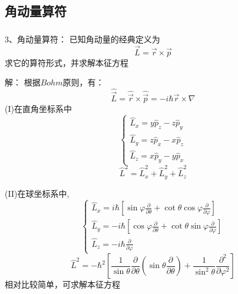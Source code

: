 \subsection{角动量算符}

\begin{frame} [allowframebreaks=]
    \frametitle{}
    \begin{tcolorbox1}{3、角动量算符：}
        已知角动量的经典定义为
    $$\vec{L}=\vec{r}\times\vec{p}$$ 
    求它的算符形式，并求解本征方程     
    \end{tcolorbox1}
    \alert{解：} 根据$Bohm$原则，有：
    $$\hat{\vec{L}}=\hat{\vec{r}}\times\hat{\vec{p}}= -i\hbar \vec{r}\times\nabla$$
    (I)在直角坐标系中\\
    $$
    \left \{
    \begin{array}{l} 
        \hat{L}_x=y\hat{p}_z-z\hat{p}_y  \\ 
        \hat{L}_y=z\hat{p}_x-x\hat{p}_z  \\ 
        \hat{L}_z=x\hat{p}_y-y\hat{p}_x 
    \end{array}
    \right.
    $$
    $$ \hat{L}^2= \hat{L}_x ^2+ \hat{L}_y ^2 +\hat{L}_z ^2  $$

    (II)在球坐标系中,\\
    $$
    \left\{\begin{array}{l}
        \hat{L}_{x}=i \hbar\left[\sin \varphi \frac{\partial}{\partial \theta}+\cot \theta \cos \varphi \frac{\partial}{\partial \varphi}\right] \\
        \hat{L}_{y}=-i \hbar\left[\cos \varphi \frac{\partial}{\partial \theta}+\cot \theta \sin \varphi \frac{\partial}{\partial \varphi}\right] \\
        \hat{L}_{z}=-i \hbar \frac{\partial}{\partial \varphi}
        \end{array}\right.
    $$
    $$ \hat{L}^{2}=-\hbar^{2}\left[\frac{1}{\sin \theta} \frac{\partial}{\partial \theta}\left(\sin \theta \frac{\partial}{\partial \theta}\right)+\frac{1}{\sin ^{2} \theta} \frac{\partial^{2}}{\partial \varphi^{2}}\right] $$
    相对比较简单，可求解本征方程
\end{frame} 


